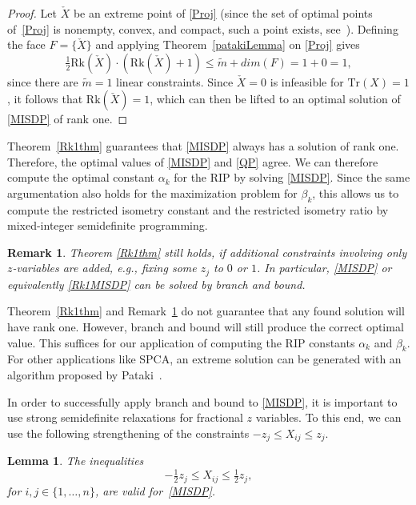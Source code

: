 \documentclass[journal]{IEEEtran}
\newtheorem{remark}{Remark}
\newtheorem{lemma}[theorem]{Lemma}
\newcommand{\Tr}{\text{Tr}}
\newcommand{\Rk}{\text{Rk}}
\begin{document}
\begin{proof}
  Let $\check{X}$ be an extreme point of \eqref{Proj} (since the set of
  optimal points of~\eqref{Proj} is nonempty, convex, and compact, such a
  point exists, see~\cite[Corollary 18.5.1]{Roc70}). Defining the face $F =
  \{\check{X}\}$ and applying Theorem~\ref{patakiLemma} on \eqref{Proj}
  gives
  \begin{equation*}
    \tfrac{1}{2} \Rk(\check{X}) \cdot (\Rk(\check{X})+1) \leq \tilde{m} + dim(F) = 1 + 0 = 1,
  \end{equation*}
  since there are $\tilde{m} = 1$ linear constraints. Since $\check{X} = 0$
  is infeasible for $\Tr(X) = 1$, it follows that $\Rk(\check{X}) = 1$,
  which can then be lifted to an optimal solution of \eqref{MISDP} of rank
  one.
\end{proof}

Theorem~\ref{Rk1thm} guarantees that \eqref{MISDP} always has a solution of
rank one. Therefore, the optimal values of \eqref{MISDP} and \eqref{QP}
agree. We can therefore compute the optimal constant $\alpha_k$ for the RIP
by solving \eqref{MISDP}. Since the same argumentation also holds for the
maximization problem for $\beta_k$, this allows us to compute the
restricted isometry constant and the restricted isometry ratio by
mixed-integer semidefinite programming.

\begin{remark}\label{Rk1rmk}
  Theorem \ref{Rk1thm} still holds, if additional constraints involving
  only $z$-variables are added, e.g., fixing some $z_j$ to $0$ or $1$. In
  particular, \eqref{MISDP} or equivalently \eqref{Rk1MISDP} can be
  solved by branch and bound.
\end{remark}

Theorem~\ref{Rk1thm} and Remark~\ref{Rk1rmk} do not guarantee that any
found solution will have rank one. However, branch and bound will still
produce the correct optimal value. This suffices for our application of
computing the RIP constants $\alpha_k$ and $\beta_k$. For other
applications like SPCA, an extreme solution can be generated with an
algorithm proposed by Pataki~\cite{coneLP}.

In order to successfully apply branch and bound to \eqref{MISDP}, it is
important to use strong semidefinite relaxations for fractional $z$
variables. To this end, we can use the following strengthening of the
constraints $-z_j \leq X_{ij} \leq z_j$.

\begin{lemma}\label{HalfConstraint} 
  The inequalities
  \begin{equation}\label{eq:HalfConstraint}
    -\tfrac{1}{2} z_j \leq X_{ij} \leq \tfrac{1}{2} z_j,
  \end{equation}
  for $i, j \in \{1, \dots, n\}$, are valid for~\eqref{MISDP}.
\end{lemma}
\end{document}
